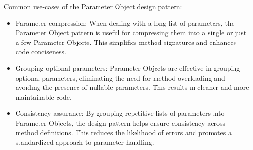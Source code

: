 Common use-cases of the Parameter Object design pattern:

\begin{itemize}
    \item Parameter compression:
    When dealing with a long list of parameters, the Parameter Object pattern is useful for compressing them into
    a single or just a few Parameter Objects.
    This simplifies method signatures and enhances code conciseness.
    \item Grouping optional parameters:
    Parameter Objects are effective in grouping optional parameters, eliminating the need for method overloading
    and avoiding the presence of nullable parameters.
    This results in cleaner and more maintainable code.
    \item Consistency assurance:
    By grouping repetitive lists of parameters into Parameter Objects, the design pattern helps ensure consistency
    across method definitions.
    This reduces the likelihood of errors and promotes a standardized approach to parameter handling.
\end{itemize}
